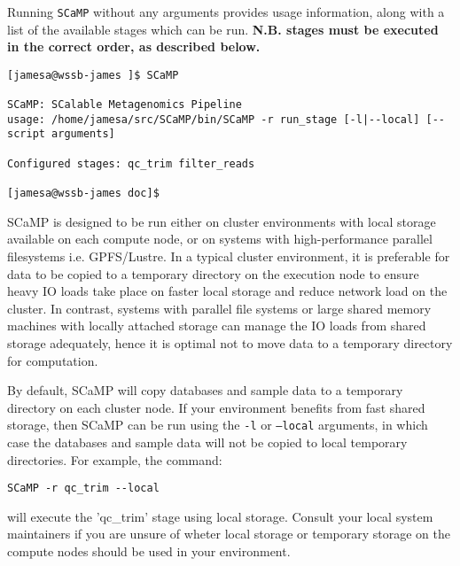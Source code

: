 \documentclass[a4paper,10pt]{article}
\begin{document}
Running {\tt SCaMP} without any arguments provides usage information, along
with a list of the available stages which can be run. \textbf{N.B. stages must
be executed in the correct order, as described below.}

\begin{verbatim}
[jamesa@wssb-james ]$ SCaMP 

SCaMP: SCalable Metagenomics Pipeline
usage: /home/jamesa/src/SCaMP/bin/SCaMP -r run_stage [-l|--local] [-- script arguments]

Configured stages: qc_trim filter_reads

[jamesa@wssb-james doc]$ 
\end{verbatim}

SCaMP is designed to be run  either on cluster environments with local storage
available on each compute node, or on systems with high-performance parallel
filesystems i.e. GPFS/Lustre. In a typical cluster environment, it is
preferable for data to be copied to a temporary directory on the execution node
to ensure heavy IO loads take place on faster local storage and reduce network
load on the cluster. In contrast, systems with parallel file systems or large
shared memory machines with locally attached storage can manage the IO loads
from shared storage adequately, hence it is optimal not to move data to a
temporary directory for computation.

By default, SCaMP will copy databases and sample data to a temporary directory
on each cluster node. If your environment benefits from fast shared storage,
then SCaMP can be run using the {\tt -l} or {\tt --local} arguments, in which
case the databases and sample data will not be copied to local temporary
directories. For example, the command:

\begin{verbatim}
SCaMP -r qc_trim --local
\end{verbatim}

will execute the 'qc\_trim' stage using local storage. Consult your local
system maintainers if you are unsure of wheter local storage or temporary
storage on the compute nodes should be used in your environment. 
\end{document}
